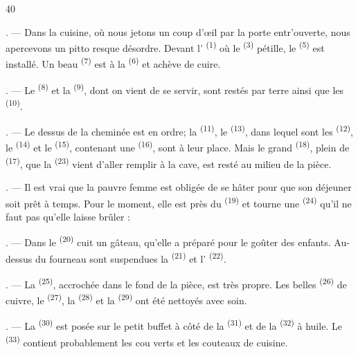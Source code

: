 \begin{VUpage}[42]{40}
\VUsaut{3.0mm}

. --- Dans la cuisine, où nous jetons un coup d'œil\nl
par la porte entr'ouverte, nous apercevons un pitto\cc
resque désordre. Devant l' \textsuperscript{(1)} où le  \textsuperscript{(3)} pétille,\nl
le  \textsuperscript{(5)} est installé. Un beau  \textsuperscript{(7)}\nl
est à la  \textsuperscript{(6)} et achève de cuire.

. --- Le  \textsuperscript{(8)} et la  \textsuperscript{(9)},\nl
dont on vient de se servir, sont restés par terre ainsi\nl
que les  \textsuperscript{(10)}.

. --- Le dessus de la cheminée est en ordre;\nl
la  \textsuperscript{(11)}, le  \textsuperscript{(13)}, dans lequel\nl
sont les  \textsuperscript{(12)}, le  \textsuperscript{(14)} et le \cc
{} \textsuperscript{(15)}, contenant une  \textsuperscript{(16)}, sont à leur\nl
place. Mais le grand  \textsuperscript{(18)}, plein de\nl
{} \textsuperscript{(17)}, que la  \textsuperscript{(23)} vient\nl
d'aller remplir à la cave, est resté au milieu de la\nl
pièce.

. --- Il est vrai que la pauvre femme est obligée\nl
de se hâter pour que son déjeuner soit prêt à temps.\nl
Pour le moment, elle est près du \cc
{} \textsuperscript{(19)} et tourne une  \textsuperscript{(24)} qu'il ne faut pas\nl
qu'elle laisse brûler :

. --- Dans le  \textsuperscript{(20)} cuit un gâteau, qu'elle a\nl
préparé pour le goûter des enfants. Au-dessus du\nl
fourneau sont suspendues la  \textsuperscript{(21)} et\nl
l' \textsuperscript{(22)}.

. --- La  \textsuperscript{(25)}, accrochée dans\nl
le fond de la pièce, est très propre. Les belles \cc
{} \textsuperscript{(26)} de cuivre, le  \textsuperscript{(27)}, la  \textsuperscript{(28)}\nl
et la  \textsuperscript{(29)} ont été nettoyés avec soin.

. --- La  \textsuperscript{(30)} est posée sur le petit\nl
buffet à côté de la  \textsuperscript{(31)} et de la  \textsuperscript{(32)}\nl
à huile. Le  \textsuperscript{(33)} contient probablement les cou\cc
verts et les couteaux de cuisine.
\end{VUpage}

